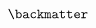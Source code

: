 \documentclass[11pt,a4paper]{book}
\theoremstyle{plain}
\numberwithin{equation}{section}
\newcommand{\term}{\textbf}
\begin{document}
\[%







\backmatter





\]
\end{document}
